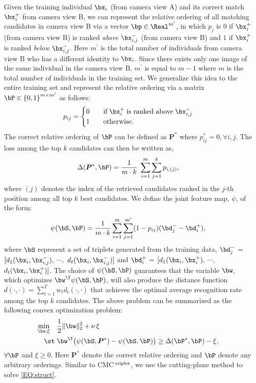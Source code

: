 \documentclass[10pt,twocolumn,letterpaper]{article}
\def\bxi{{\bx_i}}
\def\bxip{{\bx_i^{+}}}
\def\bxijm{{\bx_{i,j}^{-}}}
\def\mprime{{m^{\prime}}}
\def\bdip{{\bd_{i}^{+}}}
\def\bdjm{{\bd_{j}^{-}}}
\def\bPast{{{\boldsymbol P}^{\ast}}}
\def\CMCtriplet{{\rm CMC$^{\,\rm triplet}$}\xspace}
\begin{document}
Given the training individual $\bxi$ (from camera view A) and its correct match
$\bxip$ from camera view B,
we can represent
the relative ordering of all matching candidates in camera view B via a
vector $\bp \in \Real^\mprime$, in which
$p_j$ is $0$ if $\bxip$ (from camera view B) is ranked {\em above}
$\bxijm$ (from camera view B) and
$1$ if $\bxip$ is ranked {\em below} $\bxijm$.
Here $\mprime$ is the total number of individuals from camera view B
who has a different identity to $\bxi$.
Since there exists only one image of the same individual in the camera view B,
$\mprime$ is equal to $m-1$ where $m$ is the total number of individuals
in the training set.
We generalize this idea to the entire training set and represent
the relative ordering via a matrix
$\bP \in \left\{ 0, 1 \right\}^{m \times \mprime}$ as follows:
%
\begin{align}
    \label{EQ:piij}
        p_{ij}  =
            \begin{cases}
                0  \quad& \text{if} \; \bxip \; \text{is ranked above} \; \bxijm  \\
                1  \quad& \text{otherwise.}
            \end{cases}
\end{align}
%
%
%
%
%
The correct relative ordering of $\bP$ can be defined as $\bPast$
where $p^{\ast}_{ij} = 0, \forall i, j$.
%
%
The loss among the top $k$ candidates can then be written as,
%
\begin{align}
    \label{EQ:delta}
        \Delta (\bPast, \bP) = \frac{1}{m \cdot k} \; \sum_{i=1}^m
           \sum_{j=1}^{k} p_{i,(j)},
\end{align}
%
where $(j)$ denotes the index of the retrieved candidates
ranked in the $j$-th position among all top $k$ best candidates.
We define the joint feature map, $\psi$, of the form:
%
\begin{align}
    \label{EQ:featmap}
        \psi (\bS, \bP) = \frac{1}{m \cdot k}
            \sum_{i=1}^m \sum_{j=1}^\mprime
            (1 - p_{ij}) (\bdjm - \bdip),
\end{align}
%
where $\bS$ represent a set of triplets generated from
the training data,
%
$\bdjm$ = $[d_1(\bxi,\bxijm),$ $\cdots,$ $d_t(\bxi,\bxijm)]$ and
$\bdip$ = $[d_1(\bxi,\bxip),$ $\cdots,$ $d_t(\bxi,\bxip)]$.
%
%
%
The choice of $\psi(\bS, \bP)$
guarantees that the variable $\bw$, which optimizes
$\bw^\T \psi(\bS, \bP)$, will also produce
the distance function
$d(\cdot,\cdot) = \sum_{t=1}^T w_t d_t(\cdot,\cdot)$ that
achieves the optimal average recognition rate among
the top $k$ candidates.
The above problem can be summarized as the following convex
optimization problem:
%
%
\begin{align}
    \label{EQ:struct}
    \min_{ \bw , \xi }   \quad
    &
    \frac{1}{2} \| \bw  \|_{2}^{2} + \nu \, \xi    \\ \notag
    \st \; &
    \bw^\T \bigl( \psi(\bS, \bPast) - \psi(\bS, \bP) \bigr)
    \geq \Delta (\bP^{\ast}, \bP) - \xi,
\end{align}
$\forall \bP$ and $\xi \geq 0$.
Here $\bPast$ denote the correct relative ordering
and $\bP$ denote any arbitrary orderings.
%
%
%
Similar to \CMCtriplet, we use the cutting-plane method to solve
\eqref{EQ:struct}.
\end{document}
